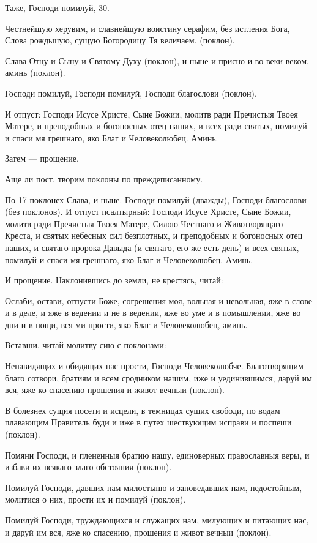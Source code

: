 Таже, Господи помилуй, 30. 

Честнейшую херувим, и славнейшую воистину серафим, без истления Бога, Слова рождьшую, сущую Богородицу Тя величаем. (поклон).

Слава Отцу и Сыну и Святому Духу (поклон), и ныне и присно и во веки веком, аминь (поклон).

Господи помилуй, Господи помилуй, Господи благослови (поклон).

И отпуст: Господи Исусе Христе, Сыне Божии, молитв ради Пречистыя Твоея Матере, и преподобных и богоносных отец наших, и всех ради святых, помилуй и спаси мя грешнаго, яко Благ и Человеколюбец. Аминь.

Затем — прощение.

Аще ли пост, творим поклоны по преждеписанному.

По 17 поклонех Слава, и ныне. Господи помилуй (дважды), Господи благослови (без поклонов). И отпуст псалтырный: Господи Исусе Христе, Сыне Божии, молитв ради Пречистыя Твоея Матере, Силою Честнаго и Животворящаго Креста, и святых небесных сил безплотных, и преподобных и богоносных отец наших, и святаго пророка Давыда (и святаго, его же есть день) и всех святых, помилуй и спаси мя грешнаго, яко Благ и Человеколюбец. Аминь.

И прощение. Наклонившись до земли, не крестясь, читай:

Ослаби, остави, отпусти Боже, согрешения моя, вольная и невольная, яже в слове и в деле, и яже в ведении и не в ведении, яже во уме и в помышлении, яже во дни и в нощи, вся ми прости, яко Благ и Человеколюбец, аминь.

Вставши, читай молитву сию с поклонами:

Ненавидящих и обидящих нас прости, Господи Человеколюбче. Благотворящим благо сотвори, братиям и всем сродником нашим, иже и уединившимся, даруй им вся, яже ко спасению прошения и живот вечныи (поклон).

В болезнех сущия посети и исцели, в темницах сущих свободи, по водам плавающим Правитель буди и иже в путех шествующим исправи и поспеши (поклон).

Помяни Господи, и плененныя братию нашу, единоверных православныя веры, и избави их всякаго злаго обстояния (поклон).

Помилуй Господи, давших нам милостыню и заповедавших нам, недостойным, молитися о них, прости их и помилуй (поклон).

Помилуй Господи, труждающихся и служащих нам, милующих и питающих нас, и даруй им вся, яже ко спасению, прошения и живот вечныи (поклон).

